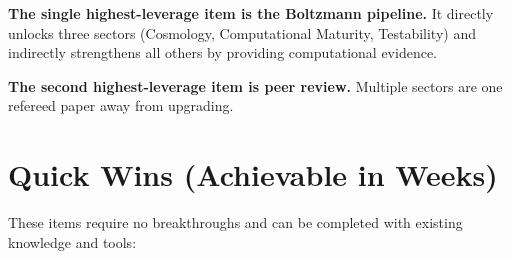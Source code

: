 \documentclass[11pt,a4paper]{article}
\begin{document}
\bigskip
\noindent\textbf{The single highest-leverage item is the Boltzmann pipeline.} It directly unlocks three sectors (Cosmology, Computational Maturity, Testability) and indirectly strengthens all others by providing computational evidence.

\noindent\textbf{The second highest-leverage item is peer review.} Multiple sectors are one refereed paper away from upgrading.


\section{Quick Wins (Achievable in Weeks)}

These items require no breakthroughs and can be completed with existing knowledge and tools:
\end{document}
